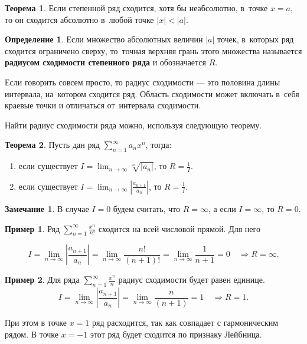 \documentclass[pdftex, 12pt, a4paper]{article}
\renewcommand{\to}{\rightarrow}
\theoremstyle{definition} %
\newtheorem*{mydef}{Определение}
\newtheorem*{rem}{Замечание}
\newtheorem{myex}{Пример}
\newtheorem{myth}{Теорема}
\numberwithin{problem}{section}
\newcommand{\indef}[1]{\textbf{#1}}
\numberwithin{blits}{section}
\begin{document}
\begin{myth}
Если степенной ряд сходится, хотя бы неабсолютно, в~точке $x=a$, то он сходится абсолютно в~любой точке $|x| < |a|$.
\end{myth}

\begin{mydef} Если множество абсолютных величин $|a|$ точек, в~которых ряд сходится ограничено сверху, то~точная верхняя грань этого множества называется \indef{радиусом сходимости степенного ряда}  и обозначается $R$.
\end{mydef}

Если говорить совсем просто, то радиус сходимости --- это половина длины  интервала, на~котором сходится ряд. Область сходимости может включать в~себя краевые точки и отличаться от~интервала сходимости.

Найти радиус сходимости ряда можно, используя следующую теорему.

\begin{myth}
Пусть дан ряд $\displaystyle \sum_{n=1}^{\infty} a_n x^n$, тогда:
\begin{enumerate}
\item если существует $I=\displaystyle \lim_{n \to \infty} \sqrt[n]{|a_n|}$, то $R = \frac{1}{I}$.
\item если существует $I =\displaystyle \lim_{n \to \infty} \left| \frac{a_{n+1}}{a_n} \right|$, то $R = \frac{1}{I}$.
\end{enumerate}
\end{myth}
\begin{rem}
В случае $I=0$ будем считать, что $R= \infty$, а если $I=\infty$, то $R=0$.
\end{rem}

\begin{myex}

Ряд $\displaystyle \sum_{n=1}^{\infty} \frac{x^n}{n!}$ сходится на всей числовой прямой. Для него

\[ I = \displaystyle \lim_{n \to \infty} \left| \frac{a_{n+1}}{a_n} \right| = \lim_{n \to \infty} \frac{n!}{(n+1)!} = \displaystyle \lim_{n \to \infty} \frac{1}{n+1} = 0 \quad \Rightarrow R = \infty.\]

\end{myex}

\begin{myex}

Для ряда $\displaystyle \sum_{n=1}^{\infty} \frac{x^n}{n}$ радиус сходимости будет равен единице.
 \[I = \displaystyle \lim_{n \to \infty} \left| \frac{a_{n+1}}{a_n} \right| = \displaystyle \lim_{n \to \infty} \frac{n}{(n+1)} =1 \quad \Rightarrow R = 1.\]

При этом в точке $x=1$ ряд расходится, так как совпадает с гармоническим рядом. В точке $x=-1$ этот ряд будет сходится по признаку Лейбница.
\end{myex}
\end{document}
